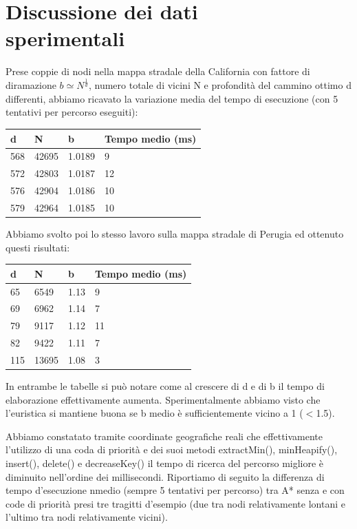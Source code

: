 \documentclass[12pt,a4paper]{report}
\begin{document}
\chapter{Discussione dei dati\\sperimentali}

Prese coppie di nodi nella mappa stradale della California con fattore di diramazione \(b \simeq N^\frac{1}{d}\), numero totale di vicini N e profondità del cammino ottimo d differenti, abbiamo ricavato la variazione media del tempo di esecuzione (con 5 tentativi per percorso eseguiti):

\begin{table}[H]
	\centering
	\begin{tabular}{@{}llll@{}}
		\toprule
		\textbf{d} & \textbf{N} & \textbf{b} & \textbf{Tempo medio (ms)}       \\ \midrule
		568 & 42695 & 1.0189 & 9  \\
		572 & 42803 & 1.0187 & 12 \\
		576 & 42904 & 1.0186 & 10 \\
		579 & 42964 & 1.0185 & 10 \\ \bottomrule
	\end{tabular}
\end{table}

Abbiamo svolto poi lo stesso lavoro sulla mappa stradale di Perugia ed ottenuto questi risultati:

\begin{table}[H]
	\centering
	\begin{tabular}{@{}llll@{}}
		\toprule
		\textbf{d} & \textbf{N} & \textbf{b} & \textbf{Tempo medio (ms)}       \\ \midrule
		65  & 6549  & 1.13 & 9  \\
		69  & 6962  & 1.14 & 7  \\
		79  & 9117  & 1.12 & 11 \\
		82  & 9422  & 1.11 & 7  \\
		115 & 13695 & 1.08 & 3 \\ \bottomrule
	\end{tabular}
\end{table}

In entrambe le tabelle si può notare come al crescere di d e di b il tempo di elaborazione effettivamente aumenta. Sperimentalmente abbiamo visto che l'euristica si mantiene buona se b medio è sufficientemente vicino a 1 (\(<\)1.5).

Abbiamo constatato tramite coordinate geografiche reali che effettivamente l'utilizzo di una coda di priorità e dei suoi metodi extractMin(), minHeapify(),
\\insert(), delete() e decreaseKey() il tempo di ricerca del percorso migliore è diminuito nell'ordine dei millisecondi.
Riportiamo di seguito la differenza di tempo d'esecuzione nmedio (sempre 5 tentativi per percorso) tra A* senza e con code di priorità presi tre tragitti d'esempio (due tra nodi relativamente lontani e l'ultimo tra nodi relativamente vicini).
\end{document}
